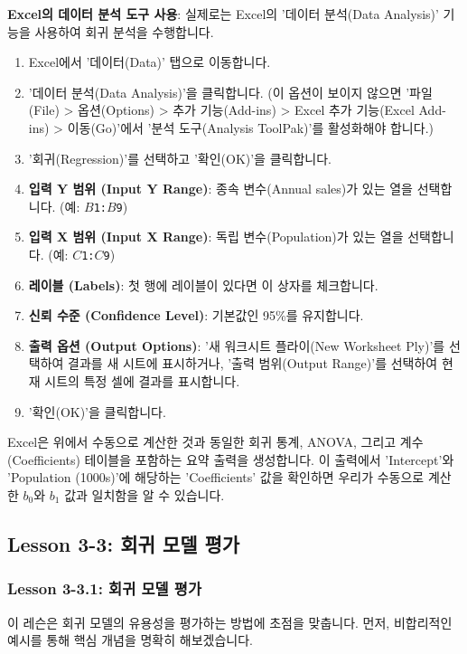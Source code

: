 \documentclass[11pt,a4paper]{book}
\theoremstyle{definition}
\begin{document}
\begin{tcolorbox}[examplebox, title={Excel 실습: 인구 및 매출 데이터}]
\textbf{Excel의 데이터 분석 도구 사용}:
실제로는 Excel의 '데이터 분석(Data Analysis)' 기능을 사용하여 회귀 분석을 수행합니다.
\begin{enumerate}[label=\arabic*.]
    \item Excel에서 '데이터(Data)' 탭으로 이동합니다.
    \item '데이터 분석(Data Analysis)'을 클릭합니다. (이 옵션이 보이지 않으면 '파일(File) > 옵션(Options) > 추가 기능(Add-ins) > Excel 추가 기능(Excel Add-ins) > 이동(Go)'에서 '분석 도구(Analysis ToolPak)'를 활성화해야 합니다.)
    \item '회귀(Regression)'를 선택하고 '확인(OK)'을 클릭합니다.
    \item \textbf{입력 Y 범위 (Input Y Range)}: 종속 변수(Annual sales)가 있는 열을 선택합니다. (예: \texttt{$B$1:$B$9})
    \item \textbf{입력 X 범위 (Input X Range)}: 독립 변수(Population)가 있는 열을 선택합니다. (예: \texttt{$C$1:$C$9})
    \item \textbf{레이블 (Labels)}: 첫 행에 레이블이 있다면 이 상자를 체크합니다.
    \item \textbf{신뢰 수준 (Confidence Level)}: 기본값인 95\%를 유지합니다.
    \item \textbf{출력 옵션 (Output Options)}: '새 워크시트 플라이(New Worksheet Ply)'를 선택하여 결과를 새 시트에 표시하거나, '출력 범위(Output Range)'를 선택하여 현재 시트의 특정 셀에 결과를 표시합니다.
    \item '확인(OK)'을 클릭합니다.
\end{enumerate}
Excel은 위에서 수동으로 계산한 것과 동일한 회귀 통계, ANOVA, 그리고 계수(Coefficients) 테이블을 포함하는 요약 출력을 생성합니다. 이 출력에서 'Intercept'와 'Population (1000s)'에 해당하는 'Coefficients' 값을 확인하면 우리가 수동으로 계산한 $b_0$와 $b_1$ 값과 일치함을 알 수 있습니다.
\end{tcolorbox}


\subsection{Lesson 3-3: 회귀 모델 평가}

\subsubsection{Lesson 3-3.1: 회귀 모델 평가}

이 레슨은 회귀 모델의 유용성을 평가하는 방법에 초점을 맞춥니다. 먼저, 비합리적인 예시를 통해 핵심 개념을 명확히 해보겠습니다.
\end{document}
